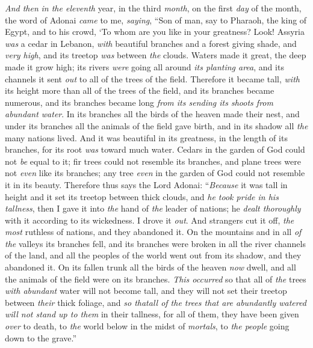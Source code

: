 \begin{biblechapter} %
 \textit{And then} \textit{in the eleventh} year, in the third \textit{month}, on the first \textit{day} of the month, the word of Adonai \textit{came} to me, \textit{saying},
\verse “Son of man, say to Pharaoh, the king of Egypt, and to his crowd,
\verse ‘To whom are you like in your greatness?
\verse Look! Assyria \textit{was} a cedar in Lebanon, 
\textit{with} beautiful branches and a forest giving shade, 
and \textit{very high}, 
and its treetop \textit{was} between \textit{the} clouds.
\verse Waters made it great, 
the deep made it grow high; 
its rivers \textit{were} going all around \textit{its planting area}, 
and its channels it sent \textit{out} 
to all of the trees of the field.
\verse Therefore it became tall, 
\textit{with} its height more than all of the trees of the field, 
and its branches became numerous, 
and its branches became long 
\textit{from its sending its shoots from abundant water}.
\verse In its branches all the birds of the heaven made their nest, 
and under its branches all the animals of the field gave birth, 
and in its shadow all \textit{the} many nations lived.
\verse And it was beautiful in its greatness, 
in the length of its branches, 
for its root \textit{was} toward much water.
\verse Cedars in the garden of God 
could not \textit{be} equal to it; 
fir trees could not resemble its branches, 
and plane trees were not \textit{even} like its branches; 
any tree \textit{even} in the garden of God 
could not resemble it in its beauty.
\verse Therefore thus says the Lord Adonai: “\textit{Because} it was tall in height and it set its treetop between thick clouds, and \textit{he took pride in his tallness},
\verse then I gave it into \textit{the} hand of \textit{the} leader of nations; he \textit{dealt thoroughly} with it according to its wickedness. I drove it \textit{out}.
\verse And strangers cut it off, \textit{the most} ruthless of nations, and they abandoned it. On the mountains and in all \textit{of the} valleys its branches fell, and its branches were broken in all the river channels of the land, and all the peoples of the world went out from its shadow, and they abandoned it.
\verse On its fallen trunk all the birds of the heaven \textit{now} dwell, and all the animals of the field were on its branches.
\verse \textit{This occurred} so that all of \textit{the} trees \textit{with abundant} water will not become tall, and they will not set their treetop between \textit{their} thick foliage, and \textit{so that}\textit{all of the trees that are abundantly watered} \textit{will not stand up to them} in their tallness, for all of them, they have been given \textit{over} to death, to \textit{the} world below in the midst of \textit{mortals}, to \textit{the people} going down to the grave.”

\end{biblechapter}
